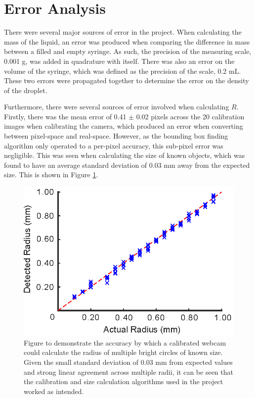 \documentclass{physics_article_B}
\begin{document}
\section{Error Analysis\label{sect:error}} 
    
    There were several major sources of error in the project. When calculating the mass of the liquid, an error was produced when comparing the difference in mass between a filled and empty syringe. As such, the precision of the measuring scale, 0.001 g, was added in quadrature with itself. There was also an error on the volume of the syringe, which was defined as the precision of the scale, 0.2 mL. These two errors were propagated together to determine the error on the density of the droplet.
    
    Furthermore, there were several sources of error involved when calculating $R$. Firstly, there was the mean error of 0.41 $\pm$ 0.02 pixels across the 20 calibration images when calibrating the camera, which produced an error when converting between pixel-space and real-space. However, as the bounding box finding algorithm only operated to a per-pixel accuracy, this sub-pixel error was negligible. This was seen when calculating the size of known objects, which was found to have an average standard deviation of 0.03 mm away from the expected size. This is shown in Figure \ref{fig:calib:error}. 
        
            \begin{figure}[H]
                \centering
                \hspace*{-1cm}\includegraphics{Figures/CameraCalib.eps}
                \caption{Figure to demonstrate the accuracy by which a calibrated webcam could calculate the radius of multiple bright circles of known size. Given the small standard deviation of 0.03 mm from expected values and strong linear agreement across multiple radii, it can be seen that the calibration and size calculation algorithms used in the project worked as intended.}
                \label{fig:calib:error}
            \end{figure}
    
\end{document}
